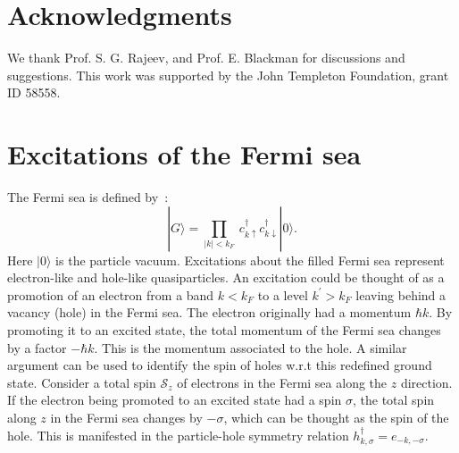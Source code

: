 \documentclass[12pt,letterpaper,aps,onecolumn,superscriptaddress,floatfix,notitlepage]{revtex4-1}
\begin{document}
	\section*{Acknowledgments}We thank Prof. S. G. Rajeev, and Prof. E. Blackman for discussions and suggestions.  This work was supported by the John Templeton Foundation, grant ID 58558.
	\appendix
	\section{Excitations of the Fermi sea\label{Ap:excitations}}
	The Fermi sea is defined by~\cite{mahan}:
	\begin{equation}
	|G\rangle = \prod_{|k|<k_{F}}~c_{k\uparrow}^{\dagger}c_{k\downarrow}^{\dagger}|0\rangle.\end{equation}
	Here $|0\rangle$ is the particle vacuum.
	Excitations about the filled Fermi sea represent electron-like and hole-like quasiparticles. An excitation could be thought of as a promotion of an electron from a band $k<k_{F}$ to a level $k^{'}>k_{F}$ leaving behind a vacancy (hole) in the Fermi sea. The electron originally had a momentum $\hbar k$. By promoting it to an excited state, the total momentum of the Fermi sea changes by a factor $-\hbar k$. This is the momentum associated to the hole. A similar argument can be used to identify the spin of holes w.r.t this redefined ground state. Consider a total spin $\mathcal{S}_{z}$ of electrons in the Fermi sea along the $z$ direction. If the electron being promoted to an excited state had a spin $\sigma$, the total spin along $z$ in the Fermi sea changes by $-\sigma$, which can be thought as the spin of the hole. This is manifested in the particle-hole symmetry relation $h^{\dagger}_{k,\sigma} = e_{-k,-\sigma}$. 
	
\end{document}
